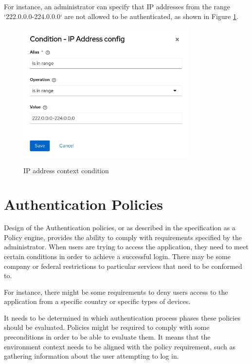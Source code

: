 For instance, an administrator can specify that IP addresses from the range `222.0.0.0-224.0.0.0` are not allowed to be authenticated, as shown in Figure \ref{fig:design-user-context-ip-addr-condition}.

\begin{figure}[htbp]
  \centering
  \includegraphics[width=0.8\textwidth]{img/sections/5-design/ip-address-condition.png}
  \label{fig:design-user-context-ip-addr-condition}
  \caption{IP address context condition}
\end{figure}

\section{Authentication Policies} \label{authentication-policies}
Design of the Authentication policies, or as described in the specification as a Policy engine, provides the ability to comply with requirements specified by the administrator.
When users are trying to access the application, they need to meet certain conditions in order to achieve a successful login.
There may be some company or federal restrictions to particular services that need to be conformed to.

For instance, there might be some requirements to deny users access to the application from a specific country or specific types of devices.

It needs to be determined in which authentication process phases these policies should be evaluated.
Policies might be required to comply with some preconditions in order to be able to evaluate them.
It means that the environment context needs to be aligned with the policy requirement, such as gathering information about the user attempting to log in.

